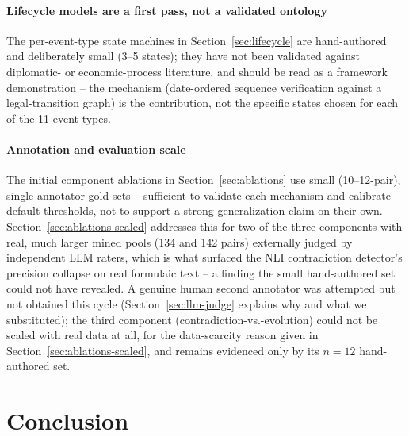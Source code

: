 \documentclass[conference]{IEEEtran}
\begin{document}
\paragraph{Lifecycle models are a first pass, not a validated ontology}
The per-event-type state machines in Section~\ref{sec:lifecycle} are
hand-authored and deliberately small (3--5 states); they have not been
validated against diplomatic- or economic-process literature, and should be
read as a framework demonstration -- the mechanism (date-ordered sequence
verification against a legal-transition graph) is the contribution, not the
specific states chosen for each of the 11 event types.

\paragraph{Annotation and evaluation scale}
The initial component ablations in Section~\ref{sec:ablations} use small
(10--12-pair), single-annotator gold sets -- sufficient to validate each
mechanism and calibrate default thresholds, not to support a strong
generalization claim on their own. Section~\ref{sec:ablations-scaled}
addresses this for two of the three components with real, much larger
mined pools (134 and 142 pairs) externally judged by independent LLM
raters, which is what surfaced the NLI contradiction detector's precision
collapse on real formulaic text -- a finding the small hand-authored set
could not have revealed. A genuine human second annotator was attempted
but not obtained this cycle (Section~\ref{sec:llm-judge} explains why and
what we substituted); the third component (contradiction-vs.-evolution)
could not be scaled with real data at all, for the data-scarcity reason
given in Section~\ref{sec:ablations-scaled}, and remains evidenced only by
its $n{=}12$ hand-authored set.

\section{Conclusion}
\label{sec:conclusion}
\end{document}
